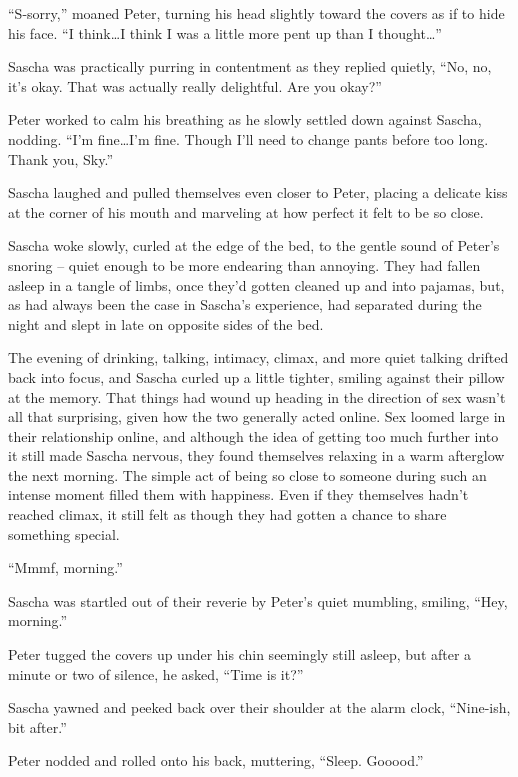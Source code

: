 ``S-sorry,'' moaned Peter, turning his head slightly toward the covers as if to hide his face. ``I think\ldots{}I think I was a little more pent up than I thought\ldots{}''

Sascha was practically purring in contentment as they replied quietly, ``No, no, it's okay. That was actually really delightful. Are you okay?''

Peter worked to calm his breathing as he slowly settled down against Sascha, nodding. ``I'm fine\ldots{}I'm fine. Though I'll need to change pants before too long. Thank you, Sky.''

Sascha laughed and pulled themselves even closer to Peter, placing a delicate kiss at the corner of his mouth and marveling at how perfect it felt to be so close.

\secdiv

Sascha woke slowly, curled at the edge of the bed, to the gentle sound of Peter's snoring -- quiet enough to be more endearing than annoying. They had fallen asleep in a tangle of limbs, once they'd gotten cleaned up and into pajamas, but, as had always been the case in Sascha's experience, had separated during the night and slept in late on opposite sides of the bed.

The evening of drinking, talking, intimacy, climax, and more quiet talking drifted back into focus, and Sascha curled up a little tighter, smiling against their pillow at the memory. That things had wound up heading in the direction of sex wasn't all that surprising, given how the two generally acted online. Sex loomed large in their relationship online, and although the idea of getting too much further into it still made Sascha nervous, they found themselves relaxing in a warm afterglow the next morning. The simple act of being so close to someone during such an intense moment filled them with happiness. Even if they themselves hadn't reached climax, it still felt as though they had gotten a chance to share something special.

``Mmmf, morning.''

Sascha was startled out of their reverie by Peter's quiet mumbling, smiling, ``Hey, morning.''

Peter tugged the covers up under his chin seemingly still asleep, but after a minute or two of silence, he asked, ``Time is it?''

Sascha yawned and peeked back over their shoulder at the alarm clock, ``Nine-ish, bit after.''

Peter nodded and rolled onto his back, muttering, ``Sleep. Gooood.''

